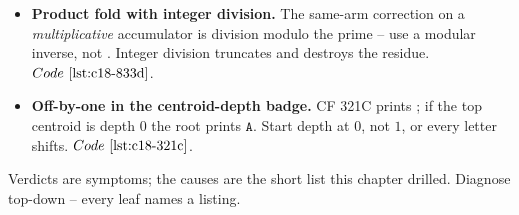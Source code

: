 \begin{itemize}[nosep, leftmargin=1.4em]
        two-pointer / dominance sweep counts \((u,v)\) and \((v,u)\); the diagonal \(u=v\) can
        also sneak in when \(2a\le L\) and \(2b\le W\). Subtract self first, then halve. \(\coderef{c18-293e}\).
  \item \textbf{Product fold with integer division.} The same-arm correction on a
        \emph{multiplicative} accumulator is division modulo the prime -- use a modular inverse,
        not \code{/}. Integer division truncates and destroys the residue. \(\coderef{c18-833d}\).
  \item \textbf{Off-by-one in the centroid-depth badge.} CF 321C prints ; if the
        top centroid is depth \(0\) the root prints \(\mathtt{A}\). Start depth at \(0\), not
        \(1\), or every letter shifts. \(\coderef{c18-321c}\).
\end{itemize}


Verdicts are symptoms; the causes are the short list this chapter drilled. Diagnose top-down --
every leaf names a listing.

